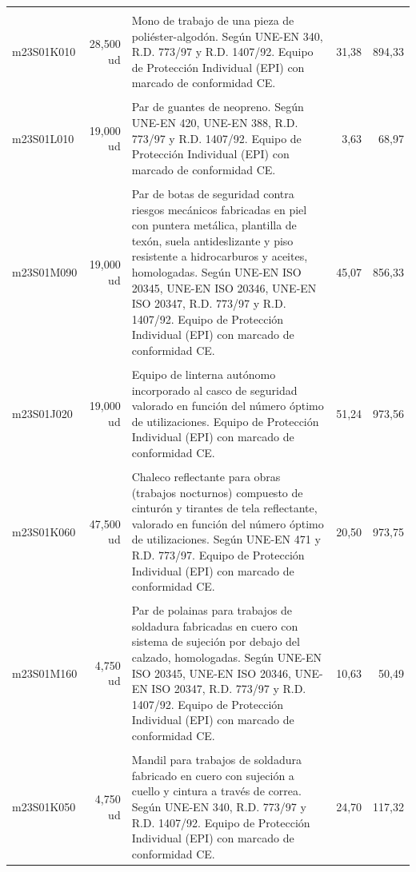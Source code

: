 \documentclass{book}%
\begin{document}
\begin{longtable}{lrlrr}
&&&&\\%
m23S01K010&    28,500 ud&\multicolumn{1}{p{5cm}}{Mono de trabajo de una pieza de poliéster{-}algodón. Según UNE{-}EN 340, R.D. 773/97 y R.D. 1407/92. Equipo de Protección Individual (EPI) con marcado de conformidad CE.}&     31,38&894,33\\%
&&&&\\%
m23S01L010&    19,000 ud&\multicolumn{1}{p{5cm}}{Par de guantes de neopreno. Según UNE{-}EN 420, UNE{-}EN 388, R.D. 773/97 y R.D. 1407/92. Equipo de Protección Individual (EPI) con marcado de conformidad CE.}&      3,63&68,97\\%
&&&&\\%
m23S01M090&    19,000 ud&\multicolumn{1}{p{5cm}}{Par de botas de seguridad contra riesgos mecánicos fabricadas en piel con puntera metálica, plantilla de texón, suela antideslizante y piso resistente a hidrocarburos y aceites, homologadas. Según UNE{-}EN ISO 20345, UNE{-}EN ISO 20346, UNE{-}EN ISO 20347, R.D. 773/97 y R.D. 1407/92. Equipo de Protección Individual (EPI) con marcado de conformidad CE.}&     45,07&856,33\\%
&&&&\\%
m23S01J020&    19,000 ud&\multicolumn{1}{p{5cm}}{Equipo de linterna autónomo incorporado al casco de seguridad valorado en función del número óptimo de utilizaciones. Equipo de Protección Individual (EPI) con marcado de conformidad CE.}&     51,24&973,56\\%
&&&&\\%
m23S01K060&    47,500 ud&\multicolumn{1}{p{5cm}}{Chaleco reflectante para obras (trabajos nocturnos) compuesto de cinturón y tirantes de tela reflectante, valorado en función del número óptimo de utilizaciones. Según UNE{-}EN 471 y R.D. 773/97. Equipo de Protección Individual (EPI) con marcado de conformidad CE.}&     20,50&973,75\\%
&&&&\\%
m23S01M160&     4,750 ud&\multicolumn{1}{p{5cm}}{Par de polainas para trabajos de soldadura fabricadas en cuero con sistema de sujeción por debajo del calzado, homologadas. Según UNE{-}EN ISO 20345, UNE{-}EN ISO 20346, UNE{-}EN ISO 20347, R.D. 773/97 y R.D. 1407/92. Equipo de Protección Individual (EPI) con marcado de conformidad CE.}&     10,63&50,49\\%
&&&&\\%
m23S01K050&     4,750 ud&\multicolumn{1}{p{5cm}}{Mandil para trabajos de soldadura fabricado en cuero con sujeción a cuello y cintura a través de correa. Según UNE{-}EN 340, R.D. 773/97 y R.D. 1407/92. Equipo de Protección Individual (EPI) con marcado de conformidad CE.}&     24,70&117,32\\%

\end{longtable}
\end{document}
